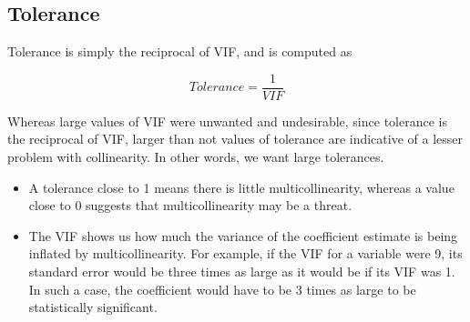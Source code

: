 \documentclass[a4paper,12pt]{article}
\begin{document}
%
%
%
%
%









\subsection*{Tolerance}
Tolerance is simply the reciprocal of VIF, and is computed as


\[ Tolerance = \frac{1}{VIF}\]

Whereas large values of VIF were unwanted and undesirable, since tolerance is the reciprocal
of VIF, larger than not values of tolerance are indicative of a lesser problem with collinearity.
In other words, we want large tolerances.

\begin{itemize}
\item A tolerance close to 1 means there is little multicollinearity, whereas a value close to 0
suggests that multicollinearity may be a threat.
\item The VIF shows us how much the variance of the coefficient estimate is being inflated by
multicollinearity. For example, if the VIF for a variable were 9, its standard error would
be three times as large as it would be if its VIF was 1. In such a case, the coefficient
would have to be 3 times as large to be statistically significant.
\end{itemize}
\end{document}
